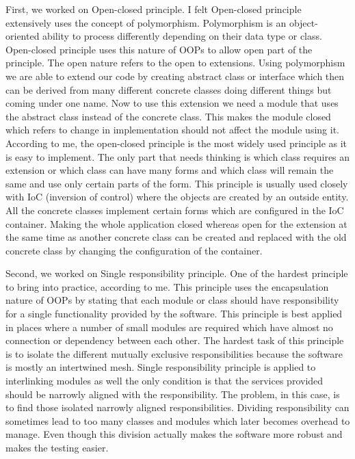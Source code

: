 First, we worked on Open-closed principle. I felt Open-closed principle extensively uses the concept of polymorphism. Polymorphism is an object-oriented ability to process differently depending on their data type or class. Open-closed principle uses this nature of OOPs to allow open part of the principle. The open nature refers to the open to extensions. Using polymorphism we are able to extend our code by creating abstract class or interface which then can be derived from many different concrete classes doing different things but coming under one name. Now to use this extension we need a module that uses the abstract class instead of the concrete class. This makes the module closed which refers to change in implementation should not affect the module using it. According to me, the open-closed principle is the most widely used principle as it is easy to implement. The only part that needs thinking is which class requires an extension or which class can have many forms and which class will remain the same and use only certain parts of the form. This principle is usually used closely with IoC (inversion of control) where the objects are created by an outside entity. All the concrete classes implement certain forms which are configured in the IoC container. Making the whole application closed whereas open for the extension at the same time as another concrete class can be created and replaced with the old concrete class by changing the configuration of the container.

Second, we worked on Single responsibility principle. One of the hardest principle to bring into practice, according to me. This principle uses the encapsulation nature of OOPs by stating that each module or class should have responsibility for a single functionality provided by the software. This principle is best applied in places where a number of small modules are required which have almost no connection or dependency between each other. The hardest task of this principle is to isolate the different mutually exclusive responsibilities because the software is mostly an intertwined mesh. Single responsibility principle is applied to interlinking modules as well the only condition is that the services provided should be narrowly aligned with the responsibility. The problem, in this case, is to find those isolated narrowly aligned responsibilities. Dividing responsibility can sometimes lead to too many classes and modules which later becomes overhead to manage. Even though this division actually makes the software more robust and makes the testing easier.

